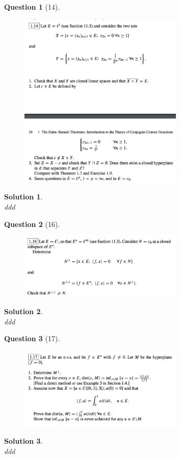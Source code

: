 \documentclass{article} %
\theoremstyle{quest}
\newtheorem*{question}{Question}
\newtheorem*{solution}{Solution}
\begin{document}
\begin{question}[14]
\hfill
\begin{figure}[h!]
  \centering
    \includegraphics[width=0.7\textwidth]{funcA-1-14.png}
\end{figure}
\end{question}
\begin{solution} \hfill \\
ddd 
\end{solution}

\newpage

\begin{question}[16]
\hfill
\begin{figure}[h!]
  \centering
    \includegraphics[width=0.7\textwidth]{funcA-1-16.png}
\end{figure}
\end{question}
\begin{solution} \hfill \\
ddd 
\end{solution}

\newpage

\begin{question}[17]
\hfill
\begin{figure}[h!]
  \centering
    \includegraphics[width=0.7\textwidth]{funcA-1-17.png}
\end{figure}
\end{question}
\begin{solution} \hfill \\
ddd 
\end{solution}
\end{document}
